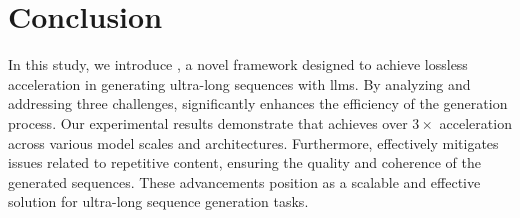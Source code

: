 \section{Conclusion}
In this study, we introduce \ours, a novel framework designed to achieve lossless acceleration in generating ultra-long sequences with \acp{llm}. By analyzing and addressing three challenges, \ours significantly enhances the efficiency of the generation process. Our experimental results demonstrate that \ours achieves over $3\times$ acceleration across various model scales and architectures. Furthermore, \ours effectively mitigates issues related to repetitive content, ensuring the quality and coherence of the generated sequences. These advancements position \ours as a scalable and effective solution for ultra-long sequence generation tasks.

